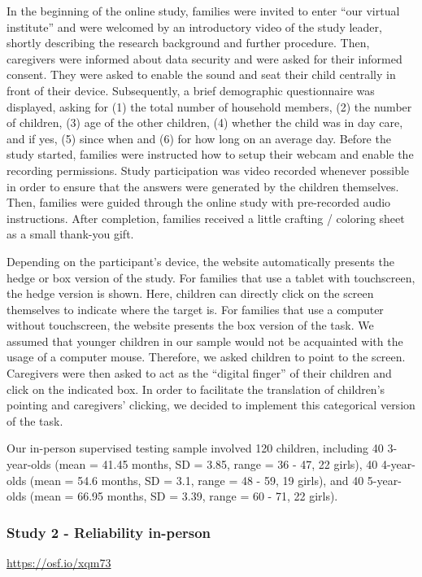 \documentclass[
  english,
  man,floatsintext]{apa6}
\begin{document}
In the beginning of the online study, families were invited to enter ``our virtual institute'' and were welcomed by an introductory video of the study leader, shortly describing the research background and further procedure. Then, caregivers were informed about data security and were asked for their informed consent. They were asked to enable the sound and seat their child centrally in front of their device. Subsequently, a brief demographic questionnaire was displayed, asking for (1) the total number of household members, (2) the number of children, (3) age of the other children, (4) whether the child was in day care, and if yes, (5) since when and (6) for how long on an average day. Before the study started, families were instructed how to setup their webcam and enable the recording permissions. Study participation was video recorded whenever possible in order to ensure that the answers were generated by the children themselves.
Then, families were guided through the online study with pre-recorded audio instructions. After completion, families received a little crafting / coloring sheet as a small thank-you gift.

Depending on the participant's device, the website automatically presents the hedge or box version of the study. For families that use a tablet with touchscreen, the hedge version is shown. Here, children can directly click on the screen themselves to indicate where the target is. For families that use a computer without touchscreen, the website presents the box version of the task. We assumed that younger children in our sample would not be acquainted with the usage of a computer mouse. Therefore, we asked children to point to the screen. Caregivers were then asked to act as the ``digital finger'' of their children and click on the indicated box. In order to facilitate the translation of children's pointing and caregivers' clicking, we decided to implement this categorical version of the task.

Our in-person supervised testing sample involved 120 children, including 40 3-year-olds (mean = 41.45 months, SD = 3.85, range = 36 - 47, 22 girls), 40 4-year-olds (mean = 54.6 months, SD = 3.1, range = 48 - 59, 19 girls), and 40 5-year-olds (mean = 66.95 months, SD = 3.39, range = 60 - 71, 22 girls).

\hypertarget{study-2---reliability-in-person}{%
\subsubsection{Study 2 - Reliability in-person}\label{study-2---reliability-in-person}}

\url{https://osf.io/xqm73}
\end{document}
